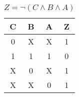 
\begin{center}
    \begin{table}[h] \caption{\(Z = \lnot (C \land B \land A) \)}
        \begin{center}
            \begin{tabular}{|c|c|c||c|} \hline
            C & B & A & Z \\ \hline\hline
            0 & X & X & 1 \\ \hline
            1 & 1 & 1 & 0 \\ \hline
            X & 0 & X & 1 \\ \hline
            X & X & 0 & 1 \\ \hline
            \end{tabular}
        \end{center}
    \end{table}
\end{center}
